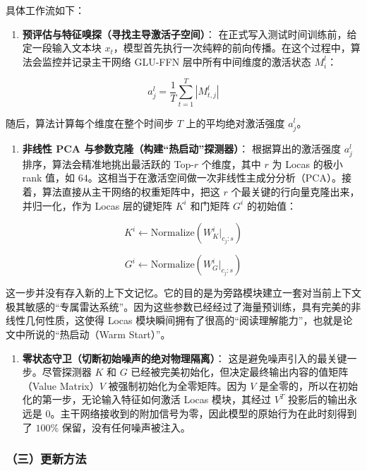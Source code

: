 具体工作流如下：

\begin{enumerate}
\def\labelenumi{\arabic{enumi}.}
\tightlist
\item
  \textbf{预评估与特征嗅探（寻找主导激活子空间）}：
  在正式写入测试时间训练前，给定一段输入文本块 \(x_t\)，模型首先执行一次纯粹的前向传播。在这个过程中，算法会监控并记录主干网络 GLU-FFN 层中所有中间维度的激活状态 \(M_i^l\)：
\end{enumerate}

\[
a_j^l = \frac{1}{T}\sum_{t=1}^{T}\left|M_{t,j}^l\right|
\]

随后，算法计算每个维度在整个时间步 \(T\) 上的平均绝对激活强度 \(a_j^l\)。

\begin{enumerate}
\def\labelenumi{\arabic{enumi}.}
\setcounter{enumi}{1}
\tightlist
\item
  \textbf{非线性 PCA 与参数克隆（构建``热启动''探测器）}：
  根据算出的激活强度 \(a_j^l\) 排序，算法会精准地挑出最活跃的 Top-\(r\) 个维度，其中 \(r\) 为 Locas 的极小 rank 值，如 \(64\)。这相当于在激活空间做一次非线性主成分分析（PCA）。接着，算法直接从主干网络的权重矩阵中，把这 \(r\) 个最关键的行向量克隆出来，并归一化，作为 Locas 层的键矩阵 \(K^i\) 和门矩阵 \(G^i\) 的初始值：
\end{enumerate}

\[
K^i \leftarrow \mathrm{Normalize}(W_K^i|_{c_j:s})
\]

\[
G^i \leftarrow \mathrm{Normalize}(W_G^i|_{c_j:s})
\]

这一步并没有存入新的上下文记忆。它的目的是为旁路模块建立一套对当前上下文极其敏感的``专属雷达系统''。因为这些参数已经经过了海量预训练，具有完美的非线性几何性质，这使得 Locas 模块瞬间拥有了很高的``阅读理解能力''，也就是论文中所说的``热启动（Warm Start）''。

\begin{enumerate}
\def\labelenumi{\arabic{enumi}.}
\setcounter{enumi}{2}
\tightlist
\item
  \textbf{零状态守卫（切断初始噪声的绝对物理隔离）}：
  这是避免噪声引入的最关键一步。尽管探测器 \(K\) 和 \(G\) 已经被完美初始化，但决定最终输出内容的值矩阵（Value Matrix）\(V\) 被强制初始化为全零矩阵。因为 \(V\) 是全零的，所以在初始化的第一步，无论输入特征如何激活 Locas 模块，其经过 \(V^T\) 投影后的输出永远是 \(0\)。主干网络接收到的附加信号为零，因此模型的原始行为在此时刻得到了 \(100\%\) 保留，没有任何噪声被注入。
\end{enumerate}

\hypertarget{ux4e09ux66f4ux65b0ux65b9ux6cd5}{%
\subsubsection{（三）更新方法}\label{ux4e09ux66f4ux65b0ux65b9ux6cd5}}


